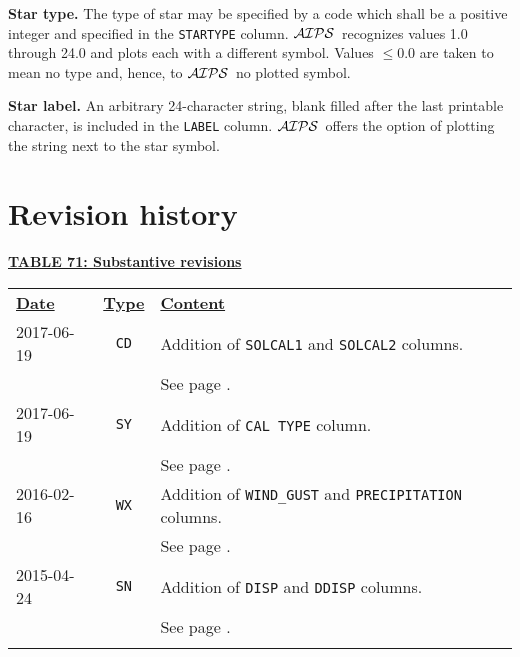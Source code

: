 \documentclass[twoside]{article}
\newcommand{\Hi}[1]{\textcolor{hicol}{#1}}
\newcommand{\AIPS}{{$\cal AIPS\/$}}
\begin{document}
{\bf Star type.} The type of star may be specified by a code which
shall be a positive integer and specified in the {\tt STARTYPE}
column.  \AIPS\ recognizes values 1.0 through 24.0 and plots each with
a different symbol.  Values $\leq 0.0$ are taken to mean no type and,
hence, to \AIPS\ no plotted symbol.

{\bf Star label.} An arbitrary 24-character string, blank filled after
the last printable character, is included in the {\tt LABEL} column.
\AIPS\ offers the option of plotting the string next to the star
symbol.

\vfill\eject
\section{\Hi{Revision history}}


\begin{center}
\Hi{\underline{\bf{TABLE 71: Substantive revisions}}}\\
\begin{tabular}{lcl}
\noalign{\vspace{6pt}} \label{ta:revisions}
\underline{{\bf Date\vphantom{y}}} & \underline{{\bf Type}} &
   \underline{{\bf Content\vphantom{y}}} \\
\noalign{\vspace{7pt}}
\Hi{2017-06-19} & \Hi{{\tt CD}} & \Hi{Addition of {\tt SOLCAL1} and
                      {\tt SOLCAL2} columns.}\\
           &          & \Hi{See page \pageref{s:CD}.} \\
\noalign{\vspace{4pt}}
\Hi{2017-06-19} & \Hi{{\tt SY}} & \Hi{Addition of {\tt CAL TYPE}
                      column.}\\
           &          & \Hi{See page \pageref{s:SY}.} \\
\noalign{\vspace{4pt}}
\Hi{2016-02-16} & \Hi{{\tt WX}} & \Hi{Addition of {\tt WIND\_GUST} and
                      {\tt PRECIPITATION} columns.}\\
           &          & \Hi{See page \pageref{s:WX}.} \\
\noalign{\vspace{4pt}}
\Hi{2015-04-24} & \Hi{{\tt SN}} & \Hi{Addition of {\tt DISP} and
                        {\tt DDISP} columns.}\\
           &          & \Hi{See page \pageref{s:SN}.} \\
\noalign{\vspace{4pt}}

\end{tabular}
\end{center}
\end{document}
